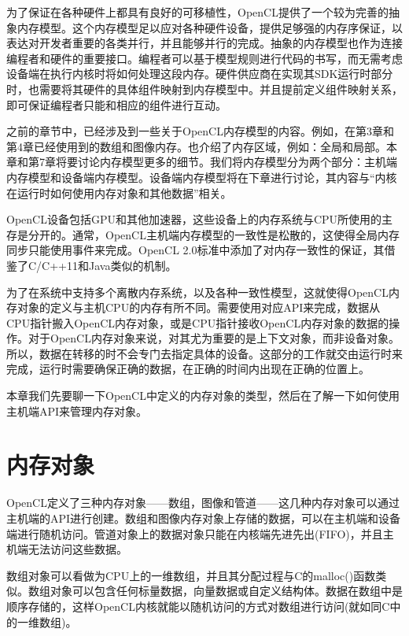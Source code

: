 
为了保证在各种硬件上都具有良好的可移植性，OpenCL提供了一个较为完善的抽象内存模型。这个内存模型足以应对各种硬件设备，提供足够强的内存序保证，以表达对开发者重要的各类并行，并且能够并行的完成。抽象的内存模型也作为连接编程者和硬件的重要接口。编程者可以基于模型规则进行代码的书写，而无需考虑设备端在执行内核时将如何处理这段内存。硬件供应商在实现其SDK运行时部分时，也需要将其硬件的具体组件映射到内存模型中。并且提前定义组件映射关系，即可保证编程者只能和相应的组件进行互动。

之前的章节中，已经涉及到一些关于OpenCL内存模型的内容。例如，在第3章和第4章已经使用到的数组和图像内存。也介绍了内存区域，例如：全局和局部。本章和第7章将要讨论内存模型更多的细节。我们将内存模型分为两个部分：主机端内存模型和设备端内存模型。设备端内存模型将在下章进行讨论，其内容与“内核在运行时如何使用内存对象和其他数据”相关。

OpenCL设备包括GPU和其他加速器，这些设备上的内存系统与CPU所使用的主存是分开的。通常，OpenCL主机端内存模型的一致性是松散的，这使得全局内存同步只能使用事件来完成。OpenCL 2.0标准中添加了对内存一致性的保证，其借鉴了C/C++11和Java类似的机制。

为了在系统中支持多个离散内存系统，以及各种一致性模型，这就使得OpenCL内存对象的定义与主机CPU的内存有所不同。需要使用对应API来完成，数据从CPU指针搬入OpenCL内存对象，或是CPU指针接收OpenCL内存对象的数据的操作。对于OpenCL内存对象来说，对其尤为重要的是上下文对象，而非设备对象。所以，数据在转移的时不会专门去指定具体的设备。这部分的工作就交由运行时来完成，运行时需要确保正确的数据，在正确的时间内出现在正确的位置上。

本章我们先要聊一下OpenCL中定义的内存对象的类型，然后在了解一下如何使用主机端API来管理内存对象。


\section{内存对象}

OpenCL定义了三种内存对象——数组，图像和管道——这几种内存对象可以通过主机端的API进行创建。数组和图像内存对象上存储的数据，可以在主机端和设备端进行随机访问。管道对象上的数据对象只能在内核端先进先出(FIFO)，并且主机端无法访问这些数据。

数组对象可以看做为CPU上的一维数组，并且其分配过程与C的malloc()函数类似。数组对象可以包含任何标量数据，向量数据或自定义结构体。数据在数组中是顺序存储的，这样OpenCL内核就能以随机访问的方式对数组进行访问(就如同C中的一维数组)。

